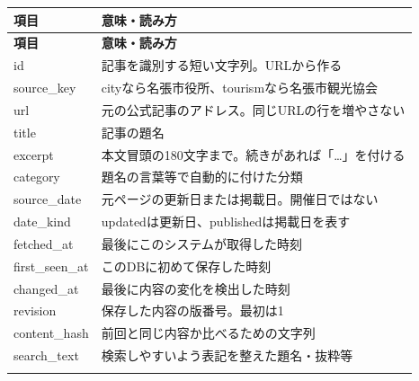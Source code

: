 \documentclass[a4paper,10pt]{ltjsarticle}
\begin{document}
{\small\begin{longtable}{@{}>{\raggedright\arraybackslash}p{}>{\raggedright\arraybackslash}p{}@{}}

\rowcolor{Pale}\textbf{項目} & \textbf{意味・読み方} \\ \midrule

\endfirsthead

\rowcolor{Pale}\textbf{項目} & \textbf{意味・読み方} \\ \midrule\endhead

id & 記事を識別する短い文字列。URLから作る \\ \addlinespace[3pt]

source\_key & cityなら名張市役所、tourismなら名張市観光協会 \\ \addlinespace[3pt]

url & 元の公式記事のアドレス。同じURLの行を増やさない \\ \addlinespace[3pt]

title & 記事の題名 \\ \addlinespace[3pt]

excerpt & 本文冒頭の180文字まで。続きがあれば「…」を付ける \\ \addlinespace[3pt]

category & 題名の言葉等で自動的に付けた分類 \\ \addlinespace[3pt]

source\_date & 元ページの更新日または掲載日。開催日ではない \\ \addlinespace[3pt]

date\_kind & updatedは更新日、publishedは掲載日を表す \\ \addlinespace[3pt]

fetched\_at & 最後にこのシステムが取得した時刻 \\ \addlinespace[3pt]

first\_seen\_at & このDBに初めて保存した時刻 \\ \addlinespace[3pt]

changed\_at & 最後に内容の変化を検出した時刻 \\ \addlinespace[3pt]

revision & 保存した内容の版番号。最初は1 \\ \addlinespace[3pt]

content\_hash & 前回と同じ内容か比べるための文字列 \\ \addlinespace[3pt]

search\_text & 検索しやすいよう表記を整えた題名・抜粋等 \\ \addlinespace[3pt]

\bottomrule\end{longtable}}
\end{document}
